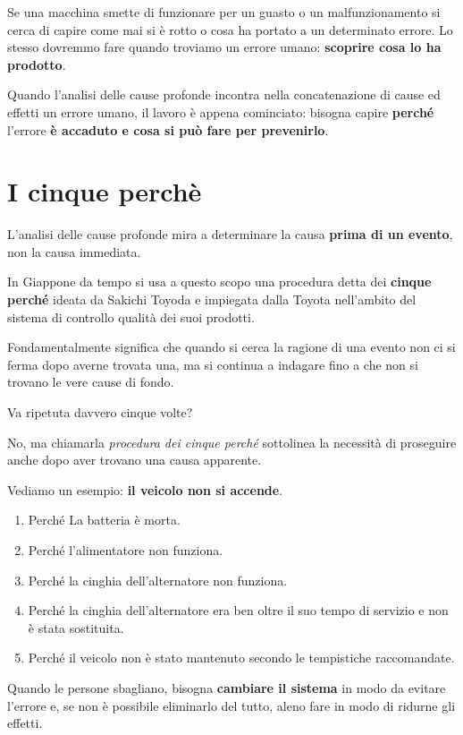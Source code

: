 \documentclass[a4paper,11pt,oneside]{book}
\begin{document}
Se una macchina smette di funzionare per un guasto o un malfunzionamento
si cerca di capire come mai si è rotto o cosa ha portato a un determinato errore. Lo
stesso dovremmo fare quando troviamo un errore umano: \textbf{scoprire cosa lo ha prodotto}.

Quando l'analisi delle cause profonde incontra nella concatenazione di cause ed effetti un errore umano, il lavoro è appena cominciato: bisogna capire \textbf{perché} l'errore \textbf{è accaduto e cosa si può fare per prevenirlo}.

\section{I cinque perchè}

L'analisi delle cause profonde mira a determinare la causa \textbf{prima di un evento}, non la causa immediata.

In Giappone da tempo si usa a questo scopo una procedura detta dei \textbf{cinque perché} ideata da Sakichi Toyoda e impiegata dalla Toyota nell'ambito del sistema di controllo qualità dei suoi prodotti.

Fondamentalmente significa che quando si cerca la ragione di una evento non ci si ferma dopo averne trovata una, ma si continua a indagare fino a che non si trovano
le vere cause di fondo.

Va ripetuta davvero cinque volte?

No, ma chiamarla \textit{procedura dei cinque perché} sottolinea la necessità di proseguire anche dopo aver trovano una
causa apparente.

Vediamo un esempio: \textbf{il veicolo non si accende}.

\begin{enumerate}
	\item Perché La batteria è morta.
	\item Perché l'alimentatore non funziona.
	\item Perché la cinghia dell'alternatore non funziona.
	\item Perché la cinghia dell'alternatore era ben oltre il suo tempo di servizio e
	      non è stata sostituita.
	\item Perché il veicolo non è stato mantenuto secondo le tempistiche raccomandate.
\end{enumerate}

Quando le persone sbagliano, bisogna \textbf{cambiare il sistema} in modo da evitare l'errore
e, se non è possibile eliminarlo del tutto, aleno fare in modo di ridurne gli effetti.
\end{document}
